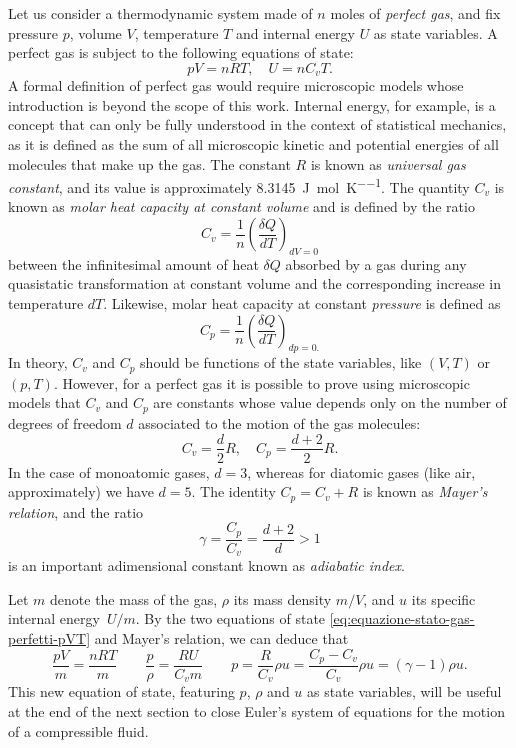 Let us consider a thermodynamic system made of $n$ moles of \emph{perfect gas},
and fix pressure $p$, volume $V$, temperature $T$ and internal energy $U$
as state variables. A perfect gas is subject to the following equations of state:
\begin{equation} \label{eq:equazione-stato-gas-perfetti-pVT}
pV = nRT, \quad U = n C_v T.
\end{equation}
A formal definition of perfect gas would require microscopic models whose
introduction is beyond the scope of this work. Internal energy, for example,
is a concept that can only be fully understood in the context of
statistical mechanics, as it is defined as the sum of all microscopic
kinetic and potential energies of all molecules that make up the gas.
The constant $R$ is known as \emph{universal gas constant},
and its value is approximately \SI{8,3145}{\joule\per\mol\per\kelvin}.
The quantity $C_v$ is known as \emph{molar heat capacity at constant volume}
and is defined by the ratio
\[
C_v = \frac{1}{n} \left(\frac{\delta Q}{dT}\right)_{dV = 0}
\]
between the infinitesimal amount of heat $\delta Q$ absorbed by a gas
during any quasistatic transformation at constant volume
and the corresponding increase in temperature $dT$.
Likewise, molar heat capacity at constant \emph{pressure} is defined as
\[
C_p = \frac{1}{n} \left(\frac{\delta Q}{dT}\right)_{dp = 0.}
\]
In theory, $C_v$ and $C_p$ should be functions of the state variables,
like $(V,T)$ or $(p,T)$. However, for a perfect gas it is possible
to prove using microscopic models that $C_v$ and $C_p$ are constants
whose value depends only on the number of degrees of freedom $d$ associated
to the motion of the gas molecules:
\[
C_v = \frac{d}{2}R, \quad C_p = \frac{d+2}{2}R.
\]
In the case of monoatomic gases, $d = 3$, whereas for diatomic gases
(like air, approximately) we have $d = 5$. The identity $C_p = C_v + R$
is known as \emph{Mayer's relation}, and the ratio
\[
\gamma = \frac{C_p}{C_v} = \frac{d+2}{d} > 1
\]
is an important adimensional constant known as \emph{adiabatic index}.

Let $m$ denote the mass of the gas, $\rho$ its mass density $m/V$,
and $u$ its specific internal energy~$U/m$. By the two equations of
state \eqref{eq:equazione-stato-gas-perfetti-pVT} and Mayer's relation,
we can deduce that
\begin{equation} \label{eq:equazione-stato-gas-perfetti-p-rho-u}
\frac{pV}{m} = \frac{nRT}{m} \qquad
\frac{p}{\rho} = \frac{RU}{C_v m} \qquad
p = \frac{R}{C_v} \rho u = \frac{C_p - C_v}{C_v} \rho u = (\gamma-1) \rho u.
\end{equation}
This new equation of state, featuring $p$, $\rho$ and $u$ as state variables,
will be useful at the end of the next section to close
Euler's system of equations for the motion of a compressible fluid.

